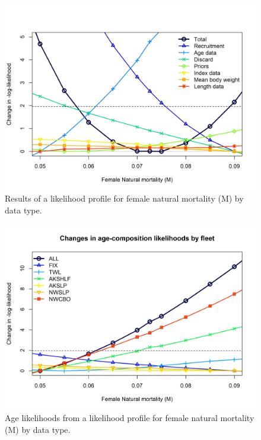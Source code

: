 \documentclass[11pt,
  english,
  a4paper,
]{article}
\begin{document}
\begin{figure}
\centering
\includegraphics[width=1\textwidth,height=1\textheight]{figs/sens_m_like.jpg}
\caption{Results of a likelihood profile for female natural mortality (M) by data type.\label{fig:sens_m_like}}
\end{figure}

\tagmcend\tagstructend


\begin{figure}
\centering
\includegraphics[width=1\textwidth,height=1\textheight]{figs/sens_m_age.jpg}
\caption{Age likelihoods from a likelihood profile for female natural mortality (M) by data type.\label{fig:sens_m_age}}
\end{figure}
\end{document}
